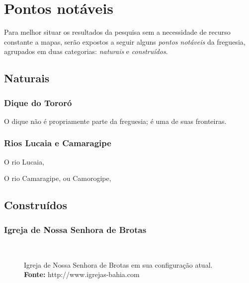 \section{Pontos notáveis}

Para melhor situar os resultados da pesquisa sem a necessidade de recurso constante a mapas, serão expostos a seguir alguns \textit{pontos notáveis} da freguesia, agrupados em duas categorias: \textit{naturais} e \textit{construídos}.

\subsection{Naturais}

\subsubsection{Dique do Tororó}

O dique não é propriamente parte da freguesia; é uma de suas fronteiras. 

\subsubsection{Rios Lucaia e Camaragipe}

O rio Lucaia, 

O rio Camaragipe, ou Camorogipe, 

\subsection{Construídos}

\subsubsection{Igreja de Nossa Senhora de Brotas}

\begin{figure}[!htp]
\centering
{}
\  %
\  %
\caption{Igreja de Nossa Senhora de Brotas em sua configuração atual. \textbf{Fonte:} http://www.igrejas-bahia.com}
\end{figure}

